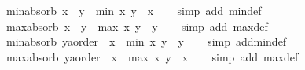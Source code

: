\begin{isabellebody}
\isanewline
{}\isamarkupfalse%
\ min{\isacharunderscore}{\kern0pt}absorb{}{\isacharcolon}{\kern0pt}\ {\isachardoublequoteopen}x\ {\isasymle}\ y\ {\isasymLongrightarrow}\ min\ x\ y\ {\isacharequal}{\kern0pt}\ x{\isachardoublequoteclose}\isanewline
%
\isadelimproof
\ \ %
\endisadelimproof
%
\isatagproof
{}\isamarkupfalse%
\ {\isacharparenleft}{\kern0pt}simp\ add{\isacharcolon}{\kern0pt}\ min{\isacharunderscore}{\kern0pt}def{\isacharparenright}{\kern0pt}%
\endisatagproof
{\isafoldproof}%
%
\isadelimproof
\isanewline
%
\endisadelimproof
\isanewline
{}\isamarkupfalse%
\ max{\isacharunderscore}{\kern0pt}absorb{}{\isacharcolon}{\kern0pt}\ {\isachardoublequoteopen}x\ {\isasymle}\ y\ {\isasymLongrightarrow}\ max\ x\ y\ {\isacharequal}{\kern0pt}\ y{\isachardoublequoteclose}\isanewline
%
\isadelimproof
\ \ %
\endisadelimproof
%
\isatagproof
{}\isamarkupfalse%
\ {\isacharparenleft}{\kern0pt}simp\ add{\isacharcolon}{\kern0pt}\ max{\isacharunderscore}{\kern0pt}def{\isacharparenright}{\kern0pt}%
\endisatagproof
{\isafoldproof}%
%
\isadelimproof
\isanewline
%
\endisadelimproof
\isanewline
{}\isamarkupfalse%
\ min{\isacharunderscore}{\kern0pt}absorb{}{\isacharcolon}{\kern0pt}\ {\isachardoublequoteopen}{\isacharparenleft}{\kern0pt}y{\isacharcolon}{\kern0pt}{\isacharcolon}{\kern0pt}{\isacharprime}{\kern0pt}a{\isacharcolon}{\kern0pt}{\isacharcolon}{\kern0pt}order{\isacharparenright}{\kern0pt}\ {\isasymle}\ x\ {\isasymLongrightarrow}\ min\ x\ y\ {\isacharequal}{\kern0pt}\ y{\isachardoublequoteclose}\isanewline
%
\isadelimproof
\ \ %
\endisadelimproof
%
\isatagproof
{}\isamarkupfalse%
\ {\isacharparenleft}{\kern0pt}simp\ add{\isacharcolon}{\kern0pt}min{\isacharunderscore}{\kern0pt}def{\isacharparenright}{\kern0pt}%
\endisatagproof
{\isafoldproof}%
%
\isadelimproof
\isanewline
%
\endisadelimproof
\isanewline
{}\isamarkupfalse%
\ max{\isacharunderscore}{\kern0pt}absorb{}{\isacharcolon}{\kern0pt}\ {\isachardoublequoteopen}{\isacharparenleft}{\kern0pt}y{\isacharcolon}{\kern0pt}{\isacharcolon}{\kern0pt}{\isacharprime}{\kern0pt}a{\isacharcolon}{\kern0pt}{\isacharcolon}{\kern0pt}order{\isacharparenright}{\kern0pt}\ {\isasymle}\ x\ {\isasymLongrightarrow}\ max\ x\ y\ {\isacharequal}{\kern0pt}\ x{\isachardoublequoteclose}\isanewline
%
\isadelimproof
\ \ %
\endisadelimproof
%
\isatagproof
{}\isamarkupfalse%
\ {\isacharparenleft}{\kern0pt}simp\ add{\isacharcolon}{\kern0pt}\ max{\isacharunderscore}{\kern0pt}def{\isacharparenright}{\kern0pt}%

\end{isabellebody}
